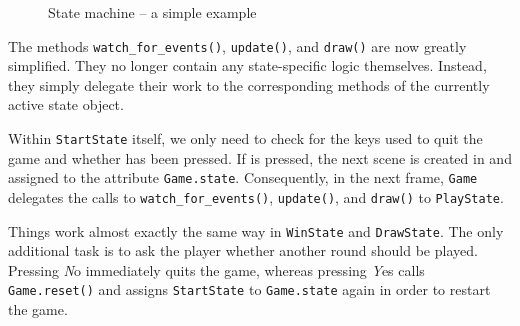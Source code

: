 \begin{figure}[htb]
	\caption{State machine -- a simple example}\label{picStateMachine01}
\end{figure}

The methods \texttt{watch\_for\_events()}, \texttt{update()}, and \texttt{draw()} are now greatly simplified. They no longer contain any state-specific logic themselves. Instead, they simply delegate their work to the corresponding methods of the currently active state object.


Within \texttt{StartState} itself, we only need to check for the keys used to quit the game and whether  has been pressed. If  is pressed, the next scene is created in  and assigned to the attribute \texttt{Game.state}. Consequently, in the next frame, \texttt{Game} delegates the calls to \texttt{watch\_for\_events()}, \texttt{update()}, and \texttt{draw()} to \texttt{PlayState}.


Things work almost exactly the same way in \texttt{WinState} and \texttt{DrawState}. The only additional task is to ask the player whether another round should be played. Pressing \emph{N}o immediately quits the game, whereas pressing \emph{Y}es calls \texttt{Game.reset()} and assigns \texttt{StartState} to \texttt{Game.state} again in order to restart the game.


